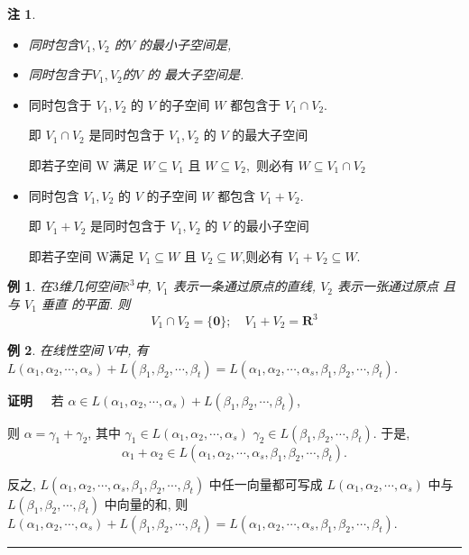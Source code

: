 \documentclass[13pt]{beamer}
\newtheorem{exa}{例}
\newtheorem*{rem}{注}
\def\qed{\nopagebreak\hfill{\rule{4pt}{7pt}}\medbreak}
\def\pf{{\bf 证明~~ }}
\def\R{\mathbb{R}}
\def\0{\mathbf{0}}
\def\a{\alpha}
\def\b{\beta}
\def\r{\gamma}
\begin{document}
\begin{frame}
\begin{rem}
	\begin{itemize}
		\item 同时包含$V_ 1, V_2$ 的$V$ 的最小子空间是\underline{\qquad\qquad},
		\item 同时包含于$V_1,  V_2$的$V$ 的
最大子空间是\underline{\qquad\qquad}.
	\end{itemize}
\end{rem}

\begin{itemize}
\item 同时包含于 $V_{1}, V_{2}$ 的 $V$ 的子空间 $W$ 都包含于 $V_{1} \cap V_{2}$.
	
	即 $V_{1} \cap V_{2}$ 是同时包含于 $V_{1}, V_{2}$ 的 $V$ 的最大子空间
	
	即若子空间 W 满足 $W \subseteq V_{1}$ 且 $W \subseteq V_{2},$ 则必有 $W \subseteq V_{1} \cap V_{2}$

\item 同时包含 $V_{1}, V_{2}$ 的 $V$ 的子空间 $W$ 都包含 $V_{1}+V_{2} .$ 

即 $V_{1}+V_{2}$ 是同时包含于 $V_{1}, V_{2}$ 的 $V$ 的最小子空间

即若子空间 W满足 $V_{1} \subseteq W$ 且 $V_{2} \subseteq W$,则必有 $V_{1}+V_{2} \subseteq W$.
\end{itemize}
\end{frame}



\begin{frame}
\begin{exa}
在$3$维几何空间$\R^3$中, $V_{1}$ 表示一条通过原点的直线, $V_{2}$ 表示一张通过原点 且与 $V_{1}$ 垂直 的平面. 则
\[
V_{1} \cap V_{2}=\{\0\} ; \quad V_{1}+V_{2}=\mathbf{R}^{3}
\]
\end{exa}

\begin{exa}
在线性空间 $V$中, 有
$L\left(\a_{1}, \a_{2}, \cdots, \a_{s}\right)+L\left(\b_{1}, \b_{2}, \cdots, \b_{t}\right)=L\left(\a_{1}, \a_{2}, \cdots, \a_{s}, \b_{1}, \b_{2}, \cdots, \b_{t}\right)$.
\end{exa}
\small{
\pf 
若 $\alpha \in L\left(\a_{1}, \a_{2}, \cdots, \a_{s}\right)+L\left(\b_{1}, \b_{2}, \cdots, \b_{t}\right)$, 

则 $\alpha=\r_{1}+\r_{2}$, 
其中 $\r_{1} \in L\left(\a_{1}, \a_{2}, \cdots, \a_{s}\right)$
$\r_{2} \in L\left(\b_{1}, \b_{2}, \cdots, \b_{t}\right)$. 于是,  $$\alpha_{1}+\alpha_{2} \in L\left(\a_{1}, \a_{2}, \cdots, \a_{s}, \b_{1}, \b_{2}, \cdots, \b_{t}\right).$$

反之, $L\left(\a_{1}, \a_{2}, \cdots, \a_{s}, \b_{1}, \b_{2}, \cdots, \b_{t}\right)$ 中任一向量都可写成 $L\left(\a_{1}, \a_{2}, \cdots, \a_{s}\right)$ 中与 $L\left(\b_{1}, \b_{2}, \cdots, \b_{t}\right)$ 中向量的和,
则 $L\left(\a_{1}, \a_{2}, \cdots, \a_{s}\right)+L\left(\b_{1}, \b_{2}, \cdots, \b_{t}\right)=L\left(\a_{1}, \a_{2}, \cdots, \a_{s}, \b_{1}, \b_{2}, \cdots, \b_{t}\right).$
}\qed



\end{frame}
\end{document}
